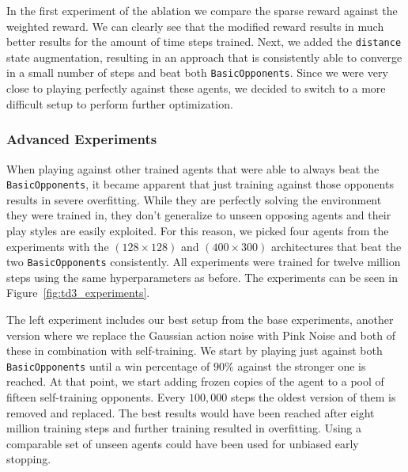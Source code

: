 In the first experiment of the ablation we compare the sparse reward against the weighted reward. We can clearly see that the modified reward results in much better results for the amount of time steps trained. Next, we added the \texttt{distance} state augmentation, resulting in an approach that is consistently able to converge in a small number of steps and beat both \texttt{BasicOpponents}. Since we were very close to playing perfectly against these agents, we decided to switch to a more difficult setup to perform further optimization. 

\subsubsection{Advanced Experiments}

When playing against other trained agents that were able to always beat the \texttt{BasicOpponents}, it became apparent that just training against those opponents results in severe overfitting. While they are perfectly solving the environment they were trained in, they don't generalize to unseen opposing agents and their play styles are easily exploited. For this reason, we picked four agents from the experiments with the $(128 \times 128)$ and $(400 \times 300)$ architectures that beat the two \texttt{BasicOpponents} consistently. All experiments were trained for twelve million steps using the same hyperparameters as before. The experiments can be seen in Figure~\ref{fig:td3_experiments}. 


The left experiment includes our best setup from the base experiments, another version where we replace the Gaussian action noise with Pink Noise and both of these in combination with self-training. We start by playing just against both \texttt{BasicOpponents} until a win percentage of $90\%$ against the stronger one is reached. At that point, we start adding frozen copies of the agent to a pool of fifteen self-training opponents. Every $100,000$ steps the oldest version of them is removed and replaced. The best results would have been reached after eight million training steps and further training resulted in overfitting. Using a comparable set of unseen agents could have been used for unbiased early stopping.


